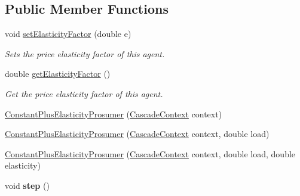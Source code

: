 \subsection*{Public Member Functions}
\begin{DoxyCompactItemize}
\item 
void \hyperlink{classuk_1_1ac_1_1dmu_1_1iesd_1_1cascade_1_1agents_1_1prosumers_1_1_constant_plus_elasticity_prosumer_a26db30b5c06c69d8aabc3cc78ce46005}{set\-Elasticity\-Factor} (double e)
\begin{DoxyCompactList}\small\item\em Sets the {\ttfamily price elasticity factor} of this agent. \end{DoxyCompactList}\item 
double \hyperlink{classuk_1_1ac_1_1dmu_1_1iesd_1_1cascade_1_1agents_1_1prosumers_1_1_constant_plus_elasticity_prosumer_a880795087b996106f4d1a9255ea99098}{get\-Elasticity\-Factor} ()
\begin{DoxyCompactList}\small\item\em Get the {\ttfamily price elasticity factor} of this agent. \end{DoxyCompactList}\item 
\hyperlink{classuk_1_1ac_1_1dmu_1_1iesd_1_1cascade_1_1agents_1_1prosumers_1_1_constant_plus_elasticity_prosumer_affa23f5c0a11686286716d28eb050a6f}{Constant\-Plus\-Elasticity\-Prosumer} (\hyperlink{classuk_1_1ac_1_1dmu_1_1iesd_1_1cascade_1_1context_1_1_cascade_context}{Cascade\-Context} context)
\item 
\hyperlink{classuk_1_1ac_1_1dmu_1_1iesd_1_1cascade_1_1agents_1_1prosumers_1_1_constant_plus_elasticity_prosumer_a2e8ac68bdd75ee240c1099dfe1d525af}{Constant\-Plus\-Elasticity\-Prosumer} (\hyperlink{classuk_1_1ac_1_1dmu_1_1iesd_1_1cascade_1_1context_1_1_cascade_context}{Cascade\-Context} context, double load)
\item 
\hyperlink{classuk_1_1ac_1_1dmu_1_1iesd_1_1cascade_1_1agents_1_1prosumers_1_1_constant_plus_elasticity_prosumer_a70f5af9fff3f2faa6ad2508ea28d39e3}{Constant\-Plus\-Elasticity\-Prosumer} (\hyperlink{classuk_1_1ac_1_1dmu_1_1iesd_1_1cascade_1_1context_1_1_cascade_context}{Cascade\-Context} context, double load, double elasticity)
\item 
\hypertarget{classuk_1_1ac_1_1dmu_1_1iesd_1_1cascade_1_1agents_1_1prosumers_1_1_constant_plus_elasticity_prosumer_ab875726eedfc30cfbb1ed723d3df4a24}{void {\bfseries step} ()}\label{classuk_1_1ac_1_1dmu_1_1iesd_1_1cascade_1_1agents_1_1prosumers_1_1_constant_plus_elasticity_prosumer_ab875726eedfc30cfbb1ed723d3df4a24}

\end{DoxyCompactItemize}
